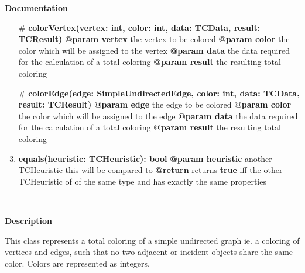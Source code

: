 	\textbf{Documentation}
	\begin{enumerate}[+]
		\item[\#]{
			\textbf{colorVertex(vertex: int, color: int, data: TCData, result: TCResult)} \newline
			\textbf{@param vertex} the vertex to be colored \newline
			\textbf{@param color} the color which will be assigned to the vertex \newline
			\textbf{@param data} the data required for the calculation of a total coloring \newline
			\textbf{@param result} the resulting total coloring
		}
		\item[\#]{
			\textbf{colorEdge(edge: SimpleUndirectedEdge, color: int, data: TCData, result: TCResult)} \newline
			\textbf{@param edge} the edge to be colored \newline
			\textbf{@param color} the color which will be assigned to the edge \newline
			\textbf{@param data} the data required for the calculation of a total coloring \newline
			\textbf{@param result} the resulting total coloring
		}
		\item{
			\textbf{equals(heuristic: TCHeuristic): bool} \newline
			\textbf{@param heuristic} another TCHeuristic this will be compared to \newline
			\textbf{@return} returns \textbf{true} iff the other TCHeuristic of of the same type and has exactly the same properties
		}
	\end{enumerate}
	
	~\newline
	~\newline
	~\newline
	
	
	\textbf{Description}
	
	This class represents a total coloring of a simple undirected graph ie. a coloring of vertices and edges, such that no two adjacent or incident objects share the same color. Colors are represented as integers.
	
